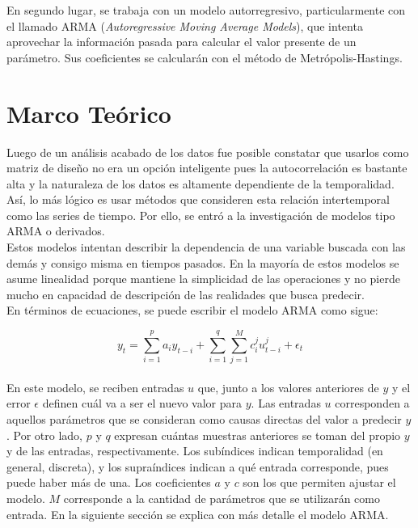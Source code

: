 \documentclass[letterpaper, 12pt]{article}
\begin{document}
En segundo lugar, se trabaja con un modelo autorregresivo, particularmente con el llamado ARMA (\textit{Autoregressive Moving Average Models}), que intenta aprovechar la información pasada para calcular el valor presente de un parámetro. Sus coeficientes se calcularán con el método de Metrópolis-Hastings.

\section{Marco Teórico}

Luego de un análisis acabado de los datos fue posible constatar que usarlos como matriz de diseño no era un opción inteligente pues la autocorrelación es bastante alta y la naturaleza de los datos es altamente dependiente de la temporalidad. Así, lo más lógico es usar métodos que consideren esta relación intertemporal como las series de tiempo. Por ello, se entró a la investigación de modelos tipo ARMA o derivados.\\

Estos modelos intentan describir la dependencia de una variable buscada con las demás y consigo misma en tiempos pasados. En la mayoría de estos modelos se asume linealidad porque mantiene la simplicidad de las operaciones y no pierde mucho en capacidad de descripción de las realidades que busca predecir.\\

En términos de ecuaciones, se puede escribir el modelo ARMA como sigue:

\begin{equation*}
    y_{t} = \sum_{i=1}^{p}{a_{i} y_{t-i}} + \sum_{i=1}^{q}{\sum_{j=1}^{M} c_{i}^{j}u_{t-i}^{j}} + \epsilon_{t}
\end{equation*}
\\

En este modelo, se reciben entradas $u$ que, junto a los valores anteriores de $y$ y el error $\epsilon$ definen cuál va a ser el nuevo valor para $y$. Las entradas $u$ corresponden a aquellos parámetros que se consideran como causas directas del valor a predecir $y$. Por otro lado, $p$ y $q$ expresan cuántas muestras anteriores se toman del propio $y$ y de las entradas, respectivamente. Los subíndices indican temporalidad (en general, discreta), y los supraíndices indican a qué entrada corresponde, pues puede haber más de una. Los coeficientes $a$ y $c$ son los que permiten ajustar el modelo. $M$ corresponde a la cantidad de parámetros que se utilizarán como entrada. En la siguiente sección se explica con más detalle el modelo ARMA. \\
\end{document}
